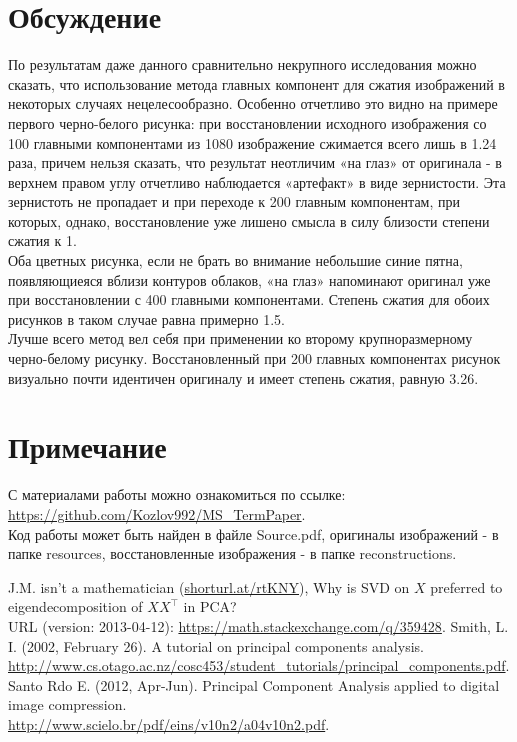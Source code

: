 \documentclass[a4paper]{article}
\begin{document}
\section{Обсуждение}
По результатам даже данного сравнительно некрупного исследования можно сказать, что использование метода главных компонент для сжатия изображений в некоторых случаях нецелесообразно. Особенно отчетливо это видно на примере первого черно-белого рисунка: при восстановлении исходного изображения со 100 главными компонентами из 1080 изображение сжимается всего лишь в 1.24 раза, причем нельзя сказать, что результат неотличим «на глаз» от оригинала - в верхнем правом углу отчетливо наблюдается «артефакт» в виде зернистости. Эта зернистоть не пропадает и при переходе к 200 главным компонентам, при которых, однако, восстановление уже лишено смысла в силу близости степени сжатия к 1.\\
Оба цветных рисунка, если не брать во внимание небольшие синие пятна, появляющиеяся вблизи контуров облаков, «на глаз» напоминают оригинал уже при восстановлении с 400 главными компонентами. Степень сжатия для обоих рисунков в таком случае равна примерно 1.5.\\
Лучше всего метод вел себя при применении ко второму крупноразмерному черно-белому рисунку. Восстановленный при 200 главных компонентах рисунок визуально почти идентичен оригиналу и имеет степень сжатия, равную 3.26.
\section*{Примечание}
С материалами работы можно ознакомиться по ссылке: \url{https://github.com/Kozlov992/MS_TermPaper}.\\ Код работы может быть найден в файле Source.pdf, оригиналы изображений - в папке resources, восстановленные изображения - в папке reconstructions.
\begin{thebibliography}{9}
J.M. isn't a mathematician (\url{shorturl.at/rtKNY}), Why is SVD on $X$ preferred to eigendecomposition of $XX^\top$ in PCA?\\URL (version: 2013-04-12): \url{https://math.stackexchange.com/q/359428}.
Smith, L. I. (2002, February 26). A tutorial on principal components analysis.\\
\url{http://www.cs.otago.ac.nz/cosc453/student_tutorials/principal_components.pdf}.
Santo Rdo E. (2012,  Apr-Jun). Principal Component Analysis applied to digital image compression.\\
\url{http://www.scielo.br/pdf/eins/v10n2/a04v10n2.pdf}.
\end{thebibliography}
\end{document}
